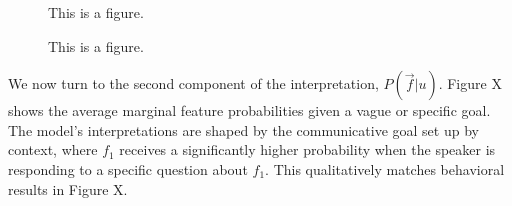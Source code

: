 \documentclass[10pt,letterpaper]{article}
\begin{document}
\begin{figure}[ht]
\begin{center}
\end{center}
\caption{This is a figure.} 
\label{scatter_full}
\end{figure}

\begin{figure}[ht]
\begin{center}
\end{center}
\caption{This is a figure.} 
\label{scatter_full}
\end{figure}

We now turn to the second component of the interpretation, $P(\vec f | u)$. Figure X shows the average marginal feature probabilities given a vague or specific goal. The model's interpretations are shaped by the communicative goal set up by context, where $f_1$ receives a significantly higher probability when the speaker is responding to a specific question about $f_1$. This qualitatively matches behavioral results in Figure X. 
\end{document}
